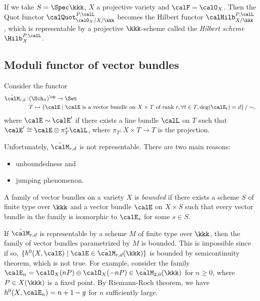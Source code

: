     If we take \(S = \Spec \kkk\), \(X\) a projective variety and \(\calF = \calO_X\).
    Then the Quot functor \(\calQuot_{\calO_X/X/\kkk}^{P,\calL}\) becomes the Hilbert functor \(\calHilb_{X/\kkk}^{P,\calL}\), which is representable by a projective \(\kkk\)-scheme called the \emph{Hilbert scheme} \(\Hilb_X^{P,\calL}\).

\subsection{Moduli functor of vector bundles}

    Consider the functor 
    \begin{align*}
        \tilde{\calM}_{r,d} : & (\Sch_S)^{\op} \to \Set \\
        & T \mapsto \left\{ 
            \calE 
        \;\middle|\;
            \calE \text{ is a vector bundle on } X \times T \text{ of rank } r, \forall t \in T, \deg(\calE_t) = d
         \right\}/ \sim,
    \end{align*}
    where \(\calE \sim \calE'\) if there exists a line bundle \(\calL\) on \(T\) such that \(\calE' \cong \calE \otimes \pi_T^* \calL\), where \(\pi_T : X \times T \to T\) is the projection.

    Unfortunately, \(\tilde{\calM}_{r,d}\) is not representable.
    There are two main reasons:
    \begin{itemize}
        \item unboundedness and 
        \item jumping phenomenon.
    \end{itemize}

    \begin{definition}\label{def:bounded_family}
        A family of vector bundles on a variety \(X\) is \emph{bounded} 
        if there exists a scheme \(S\) of finite type over \(\kkk\) and a vector bundle \(\calE\) on \(X \times S\) 
        such that every vector bundle in the family is isomorphic to \(\calE_s\) for some \(s \in S\).
    \end{definition}

    If \(\tilde{\calM}_{r,d}\) is representable by a scheme \(M\) of finite type over \(\kkk\), then the family of vector bundles parametrized by \(M\) is bounded.
    This is impossible since if so, \(\{h^0(X,\calE) \mid \calE \in \tilde{\calM}_{r,d}(\kkk)\}\) is bounded by semicontinuity theorem, which is not true.
    For example, consider the family \(\calE_n = \calO_X(nP) \oplus \calO_X(-nP) \in \tilde{\calM}_{2,0}(\kkk)\) for \(n \geq 0\), where \(P \in X(\kkk)\) is a fixed point.
    By Riemann-Roch theorem, we have \(h^0(X,\calE_n) = n + 1-g\) for \(n\) sufficiently large.


